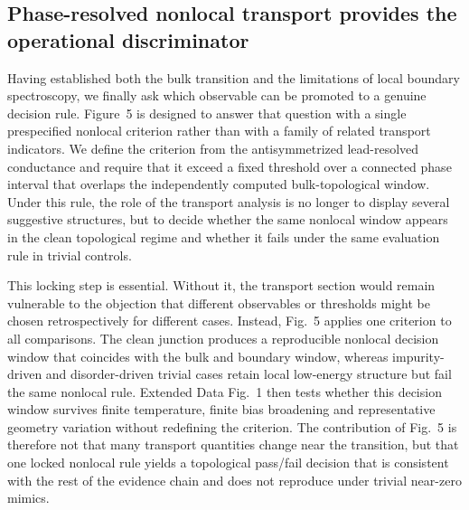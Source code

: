 \documentclass[11pt]{article}
\begin{document}
\subsection{Phase-resolved nonlocal transport provides the operational discriminator}

Having established both the bulk transition and the limitations of local boundary spectroscopy, we finally ask which observable can be promoted to a genuine decision rule. Figure~5 is designed to answer that question with a single prespecified nonlocal criterion rather than with a family of related transport indicators. We define the criterion from the antisymmetrized lead-resolved conductance and require that it exceed a fixed threshold over a connected phase interval that overlaps the independently computed bulk-topological window. Under this rule, the role of the transport analysis is no longer to display several suggestive structures, but to decide whether the same nonlocal window appears in the clean topological regime and whether it fails under the same evaluation rule in trivial controls.

This locking step is essential. Without it, the transport section would remain vulnerable to the objection that different observables or thresholds might be chosen retrospectively for different cases. Instead, Fig.~5 applies one criterion to all comparisons. The clean junction produces a reproducible nonlocal decision window that coincides with the bulk and boundary window, whereas impurity-driven and disorder-driven trivial cases retain local low-energy structure but fail the same nonlocal rule. Extended Data Fig.~1 then tests whether this decision window survives finite temperature, finite bias broadening and representative geometry variation without redefining the criterion. The contribution of Fig.~5 is therefore not that many transport quantities change near the transition, but that one locked nonlocal rule yields a topological pass/fail decision that is consistent with the rest of the evidence chain and does not reproduce under trivial near-zero mimics.
\end{document}
